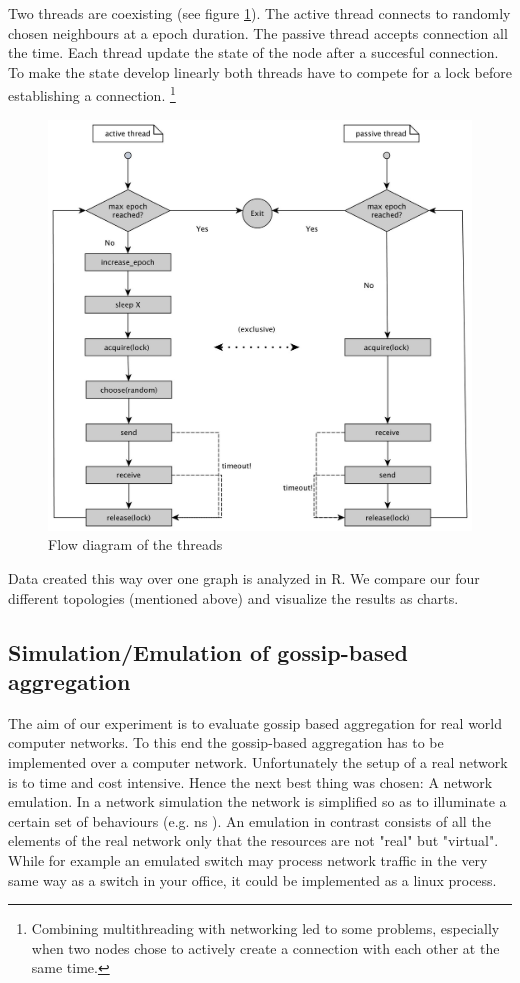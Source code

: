 Two threads are coexisting (see figure \ref{fig:flow_diag}). The active thread connects to randomly chosen neighbours at a epoch duration. The passive thread accepts connection all the time. Each thread update the state of the node after a succesful connection. To make the state develop linearly both threads have to compete for a lock before establishing a connection. \footnote{Combining multithreading with networking led to some problems, especially when two nodes chose to actively create a connection with each other at the same time.}
\begin{figure}[h!]
    \begin{center}
        \includegraphics[scale=0.25]{flow_diag.jpg}
    \end{center}
    \caption{Flow diagram of the threads}
    \label{fig:flow_diag}
\end{figure}

Data created this way over one graph is analyzed in R. We compare our four different topologies (mentioned above) and visualize the results as charts.

\subsection{Simulation/Emulation of gossip-based aggregation}
The aim of our experiment is to evaluate gossip based aggregation for real world computer networks. To this end the gossip-based aggregation has to be implemented over a computer network. Unfortunately the setup of a real network is to time and cost intensive. Hence the next best thing was chosen: A network emulation. In a network simulation the network is simplified so as to illuminate a certain set of behaviours (e.g. ns \cite{ns}). An emulation in contrast consists of all the elements of the real network only that the resources are not "real" but "virtual". While for example an emulated switch may process network traffic in the very same way as a switch in your office, it could be implemented as a linux process.

